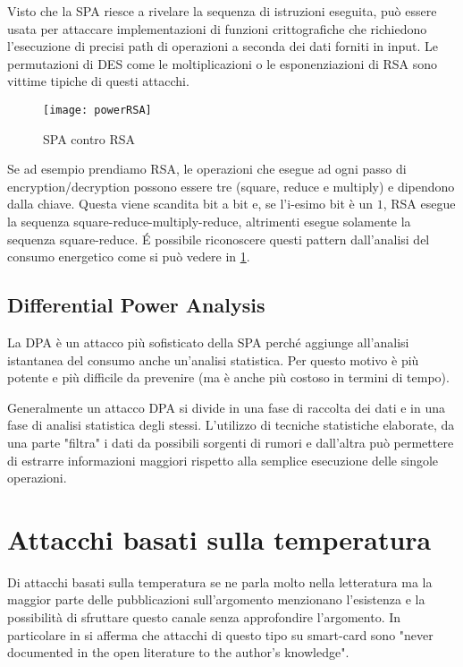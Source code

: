 		Visto che la \ac{SPA} riesce a rivelare la sequenza di istruzioni eseguita, può essere usata per attaccare implementazioni di funzioni crittografiche che richiedono l'esecuzione di precisi path di operazioni a seconda dei dati forniti in input. Le permutazioni di \ac{DES} come le moltiplicazioni o le esponenziazioni di RSA sono vittime tipiche di questi attacchi.
		
		\begin{figure}
			\begin{center}
				\texttt{[image: powerRSA]}
				\caption{SPA contro RSA}
				\label{fig:RSAPower}
			\end{center}
		\end{figure}
	
		Se ad esempio prendiamo RSA, le operazioni che esegue ad ogni passo di encryption/decryption possono essere tre (square, reduce e multiply) e dipendono dalla chiave. Questa viene scandita bit a bit e, se l'i-esimo bit è un $1$, RSA esegue la sequenza square-reduce-multiply-reduce, altrimenti esegue solamente la sequenza square-reduce. \'{E} possibile riconoscere questi pattern dall'analisi del consumo energetico come si può vedere in \cref{fig:RSAPower}. 
		
		\subsection{Differential Power Analysis}
			La \ac{DPA} è un attacco più sofisticato della \ac{SPA} perché aggiunge all'analisi istantanea del consumo anche un'analisi statistica. Per questo motivo è più potente e più difficile da prevenire (ma è anche più costoso in termini di tempo).
			
			Generalmente un attacco \ac{DPA} si divide in una fase di raccolta dei dati e in una fase di analisi statistica degli stessi. L'utilizzo di tecniche statistiche elaborate, da una parte "filtra" i dati da possibili sorgenti di rumori e dall'altra può permettere di estrarre informazioni maggiori rispetto alla semplice esecuzione delle singole operazioni. 
	
	\section{Attacchi basati sulla temperatura}
		Di attacchi basati sulla temperatura se ne parla molto nella letteratura\cite{brouchier2009temperature,brouchier2009thermocommunication,skorobogatov2002low} ma la maggior parte delle pubblicazioni sull'argomento menzionano l'esistenza e la possibilità di sfruttare questo canale senza approfondire l'argomento. In particolare in \cite{bar2006sorcerer} si afferma che attacchi di questo tipo su smart-card sono "never documented in the open literature to the author’s knowledge".
		
